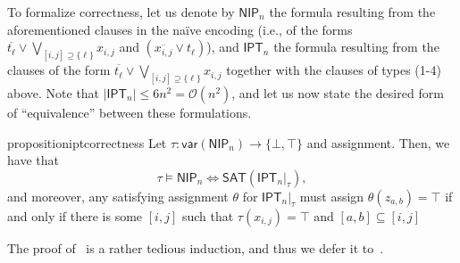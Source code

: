 \documentclass[11pt]{article}
\renewcommand{\O}{\mathcal{O}}
\begin{document}
To formalize correctness, let us denote by $\textsf{NIP}_n$ the formula resulting from the aforementioned clauses in the naïve encoding (i.e., of the forms $\overline{t_\ell} \lor \bigvee_{[i, j] \supseteq \{\ell\}} x_{i, j}$ and $(\overline{x_{i, j}} \lor t_\ell)$), and 
$\textsf{IPT}_n$ the formula resulting from the clauses of the form $\overline{t_\ell} \lor \bigvee_{[i, j] \supseteq \{\ell\}} x_{i, j}$ together with the clauses of types (1-4) above. Note that $|\textsf{IPT}_n| \leq 6n^2 = \O(n^2)$, and let us now state the desired form of ``equivalence'' between these formulations.
\begin{restatable}{proposition}{iptcorrectness}
\label{prop:ipt_correctness}
    Let $\tau : \textsf{var}(\textsf{NIP}_n) \to \{\bot, \top\}$ and assignment. Then, we have that 
    \[
    \tau \models \textsf{NIP}_n \iff \textsf{SAT}(\textsf{IPT}_n|_\tau),
    \]
    and moreover, any satisfying assignment $\theta$ for $\textsf{IPT}_n|_\tau$ must assign \( \theta(z_{a, b}) = \top \) if and only if there is some $[i, j]$ such that $\tau(x_{i, j}) = \top$ and $[a, b] \subseteq [i, j]$ 
\end{restatable}
The proof of~ is a rather tedious induction, and thus we defer it to~.
\end{document}
